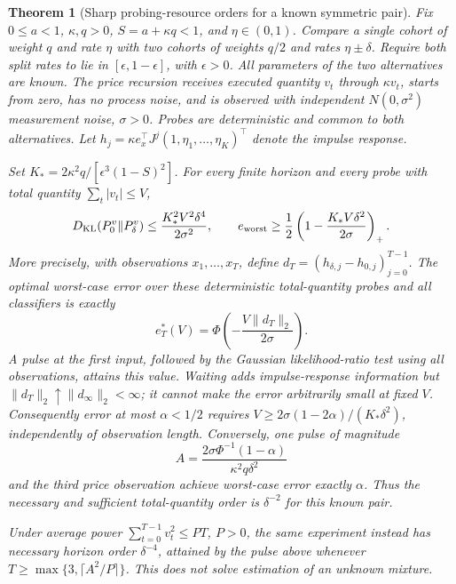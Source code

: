 \documentclass[11pt]{article}
\newtheorem{theorem}{Theorem}[section]\newtheorem{proposition}[theorem]{Proposition}\newtheorem{lemma}[theorem]{Lemma}
\begin{document}
\begin{theorem}[Sharp probing-resource orders for a known symmetric pair]
\label{thm:resource_frontier}
Fix $0\le a<1$, $\kappa,q>0$, $S=a+\kappa q<1$, and $\eta\in(0,1)$. Compare a single cohort of weight $q$ and rate $\eta$ with two cohorts of weights $q/2$ and rates $\eta\pm\delta$. Require both split rates to lie in $[\epsilon,1-\epsilon]$, with $\epsilon>0$. All parameters of the two alternatives are known. The price recursion receives executed quantity $v_t$ through $\kappa v_t$, starts from zero, has no process noise, and is observed with independent $N(0,\sigma^2)$ measurement noise, $\sigma>0$. Probes are deterministic and common to both alternatives. Let $h_j=\kappa e_x^\top J^j(1,\eta_1,\ldots,\eta_K)^\top$ denote the impulse response.

Set $K_*=2\kappa^2q/[\epsilon^3(1-S)^2]$. For every finite horizon and every probe with total quantity $\sum_t|v_t|\le V$,
\begin{equation}
D_{\rm KL}(P_0^v\|P_\delta^v)
\le \frac{K_*^2 V^2\delta^4}{2\sigma^2},\qquad
e_{\rm worst}\ge\frac12\left(1-\frac{K_*V\delta^2}{2\sigma}\right)_+.
\label{eq:quantity_information}
\end{equation}
More precisely, with observations $x_1,\ldots,x_T$, define $d_T=(h_{\delta,j}-h_{0,j})_{j=0}^{T-1}$. The optimal worst-case error over these deterministic total-quantity probes and all classifiers is exactly
\begin{equation}
e^*_T(V)=\Phi\!\left(-\frac{V\|d_T\|_2}{2\sigma}\right).
\label{eq:exact_quantity_error}
\end{equation}
A pulse at the first input, followed by the Gaussian likelihood-ratio test using all observations, attains this value. Waiting adds impulse-response information but $\|d_T\|_2\uparrow\|d_\infty\|_2<\infty$; it cannot make the error arbitrarily small at fixed $V$.
Consequently error at most $\alpha<1/2$ requires
$V\ge2\sigma(1-2\alpha)/(K_*\delta^2)$, independently of observation length. Conversely, one pulse of magnitude
\begin{equation}
A=\frac{2\sigma\Phi^{-1}(1-\alpha)}{\kappa^2q\delta^2}
\label{eq:quantity_attainability}
\end{equation}
and the third price observation achieve worst-case error exactly $\alpha$. Thus the necessary and sufficient total-quantity order is $\delta^{-2}$ for this known pair.

Under average power $\sum_{t=0}^{T-1}v_t^2\le PT$, $P>0$, the same experiment instead has necessary horizon order $\delta^{-4}$, attained by the pulse above whenever $T\ge\max\{3,\lceil A^2/P\rceil\}$. This does not solve estimation of an unknown mixture.


\end{theorem}
\end{document}
